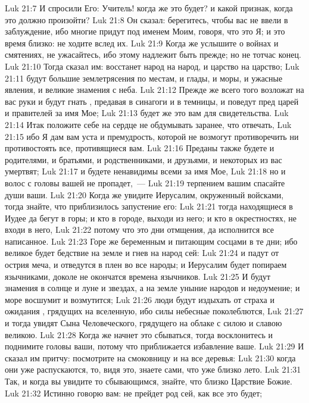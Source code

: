 \vs Luk 21:7 И спросили Его: Учитель! когда же это будет? и какой признак, когда это должно произойти?
\vs Luk 21:8 Он сказал: берегитесь, чтобы вас не ввели в заблуждение, ибо многие придут под именем Моим, говоря, что это Я; и это время близко: не ходите вслед их.
\vs Luk 21:9 Когда же услышите о войнах и смятениях, не ужасайтесь, ибо этому надлежит быть прежде; но не тотчас конец.
\vs Luk 21:10 Тогда сказал им: восстанет народ на народ, и царство на царство;
\vs Luk 21:11 будут большие землетрясения по местам, и глады, и моры, и ужасные явления, и великие знамения с неба.
\vs Luk 21:12 Прежде же всего того возложат на вас руки и будут гнать , предавая в синагоги и в темницы, и поведут пред царей и правителей за имя Мое;
\vs Luk 21:13 будет же это вам для свидетельства.
\vs Luk 21:14 Итак положите себе на сердце не обдумывать заранее, что отвечать,
\vs Luk 21:15 ибо Я дам вам уста и премудрость, которой не возмогут противоречить ни противостоять все, противящиеся вам.
\vs Luk 21:16 Преданы также будете и родителями, и братьями, и родственниками, и друзьями, и некоторых из вас умертвят;
\vs Luk 21:17 и будете ненавидимы всеми за имя Мое,
\vs Luk 21:18 но и волос с головы вашей не пропадет,~---
\vs Luk 21:19 терпением вашим спасайте души ваши.
\vs Luk 21:20 Когда же увидите Иерусалим, окруженный войсками, тогда знайте, что приблизилось запустение его:
\vs Luk 21:21 тогда находящиеся в Иудее да бегут в горы; и кто в городе, выходи из него; и кто в окрестностях, не входи в него,
\vs Luk 21:22 потому что это дни отмщения, да исполнится все написанное.
\vs Luk 21:23 Горе же беременным и питающим сосцами в те дни; ибо великое будет бедствие на земле и гнев на народ сей:
\vs Luk 21:24 и падут от острия меча, и отведутся в плен во все народы; и Иерусалим будет попираем язычниками, доколе не окончатся времена язычников.
\vs Luk 21:25 И будут знамения в солнце и луне и звездах, а на земле уныние народов и недоумение; и море восшумит и возмутится;
\vs Luk 21:26 люди будут издыхать от страха и ожидания , грядущих на вселенную, ибо силы небесные поколеблются,
\vs Luk 21:27 и тогда увидят Сына Человеческого, грядущего на облаке с силою и славою великою.
\vs Luk 21:28 Когда же начнет это сбываться, тогда восклонитесь и поднимите головы ваши, потому что приближается избавление ваше.
\vs Luk 21:29 И сказал им притчу: посмотрите на смоковницу и на все деревья:
\vs Luk 21:30 когда они уже распускаются, то, видя это, знаете сами, что уже близко лето.
\vs Luk 21:31 Так, и когда вы увидите то сбывающимся, знайте, что близко Царствие Божие.
\vs Luk 21:32 Истинно говорю вам: не прейдет род сей, как все это будет;
